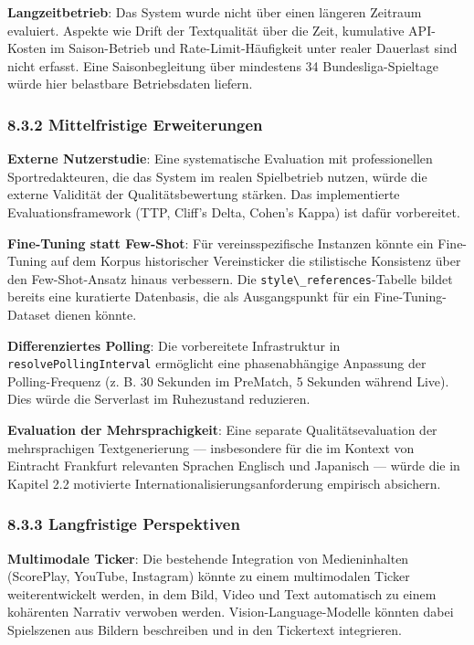 \textbf{Langzeitbetrieb}: Das System wurde nicht über einen längeren
Zeitraum evaluiert. Aspekte wie Drift der Textqualität über die Zeit,
kumulative API-Kosten im Saison-Betrieb und Rate-Limit-Häufigkeit unter
realer Dauerlast sind nicht erfasst. Eine Saisonbegleitung über
mindestens 34 Bundesliga-Spieltage würde hier belastbare Betriebsdaten
liefern.

\subsubsection{8.3.2 Mittelfristige
Erweiterungen}\label{mittelfristige-erweiterungen}

\textbf{Externe Nutzerstudie}: Eine systematische Evaluation mit
professionellen Sportredakteuren, die das System im realen Spielbetrieb
nutzen, würde die externe Validität der Qualitätsbewertung stärken. Das
implementierte Evaluationsframework (TTP, Cliff's Delta, Cohen's Kappa)
ist dafür vorbereitet.

\textbf{Fine-Tuning statt Few-Shot}: Für vereinsspezifische Instanzen
könnte ein Fine-Tuning auf dem Korpus historischer Vereinsticker die
stilistische Konsistenz über den Few-Shot-Ansatz hinaus verbessern. Die
\passthrough{\lstinline!style\_references!}-Tabelle bildet bereits eine
kuratierte Datenbasis, die als Ausgangspunkt für ein Fine-Tuning-Dataset
dienen könnte.

\textbf{Differenziertes Polling}: Die vorbereitete Infrastruktur in
\passthrough{\lstinline!resolvePollingInterval!} ermöglicht eine
phasenabhängige Anpassung der Polling-Frequenz (z. B. 30 Sekunden im
PreMatch, 5 Sekunden während Live). Dies würde die Serverlast im
Ruhezustand reduzieren.

\textbf{Evaluation der Mehrsprachigkeit}: Eine separate
Qualitätsevaluation der mehrsprachigen Textgenerierung --- insbesondere
für die im Kontext von Eintracht Frankfurt relevanten Sprachen Englisch
und Japanisch --- würde die in Kapitel 2.2 motivierte
Internationalisierungsanforderung empirisch absichern.

\subsubsection{8.3.3 Langfristige
Perspektiven}\label{langfristige-perspektiven}

\textbf{Multimodale Ticker}: Die bestehende Integration von
Medieninhalten (ScorePlay, YouTube, Instagram) könnte zu einem
multimodalen Ticker weiterentwickelt werden, in dem Bild, Video und Text
automatisch zu einem kohärenten Narrativ verwoben werden.
Vision-Language-Modelle könnten dabei Spielszenen aus Bildern
beschreiben und in den Tickertext integrieren.

